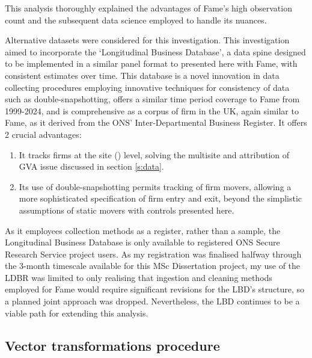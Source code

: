 This analysis thoroughly explained the advantages of Fame's high observation count
and the subsequent data science employed to handle its nuances.
\par
Alternative datasets were considered for this investigation.
This investigation aimed to incorporate the `Longitudinal Business Database',
a data spine designed to be implemented in a similar panel format
to presented here with Fame,
with consistent estimates over time\cite{Lemma2023}.
This database is a novel innovation in data collecting procedures
employing innovative techniques for consistency of data such as double-snapshotting,
offers a similar time period coverage to Fame from 1999-2024,
and is comprehensive as a corpus of firm in the UK, again similar to Fame,
as it derived from the ONS' Inter-Departmental Business Register.
It offers 2 crucial advantages:
\begin{enumerate}
    \item It tracks firms at the site () level, solving the multisite
    and attribution of GVA issue discussed in section \ref{s:data}.
    \item Its use of double-snapshotting permits tracking of firm movers,
    allowing a more sophisticated specification of firm entry and exit,
    beyond the simplistic assumptions of static movers with controls presented here.
\end{enumerate}
\par
As it employees collection methods as a register, rather than a sample,
the Longitudinal Business Database is only available to
registered ONS Secure Research Service project users.
As my registration was finalised halfway through the 3-month timescale
available for this MSc Dissertation project,
my use of the LDBR was limited to only realising that 
ingestion and cleaning methods employed for Fame would require significant revisions
for the LBD's structure,
so a planned joint approach was dropped.
Nevertheless, the LBD continues to be a viable path for extending this analysis.

\newpage
\subsection{Vector transformations procedure}
\label{app-ss:w-transformations}

